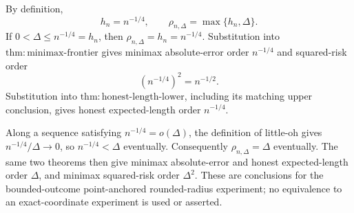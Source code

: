 By definition,
\[
 h_n=n^{-1/4},
 \qquad
 \rho_{n,\Delta}=\max\{h_n,\Delta\}.
\]
If \(0<\Delta\leq n^{-1/4}=h_n\), then \(\rho_{n,\Delta}=h_n=n^{-1/4}\).  Substitution into \(\mathrm{thm:minimax\text{-}frontier}\) gives minimax absolute-error order \(n^{-1/4}\) and squared-risk order
\[
 (n^{-1/4})^2=n^{-1/2}.
\]
Substitution into \(\mathrm{thm:honest\text{-}length\text{-}lower}\), including its matching upper conclusion, gives honest expected-length order \(n^{-1/4}\).

Along a sequence satisfying \(n^{-1/4}=o(\Delta)\), the definition of little-oh gives \(n^{-1/4}/\Delta\to0\), so \(n^{-1/4}<\Delta\) eventually.  Consequently \(\rho_{n,\Delta}=\Delta\) eventually.  The same two theorems then give minimax absolute-error and honest expected-length order \(\Delta\), and minimax squared-risk order \(\Delta^2\).  These are conclusions for the bounded-outcome point-anchored rounded-radius experiment; no equivalence to an exact-coordinate experiment is used or asserted.